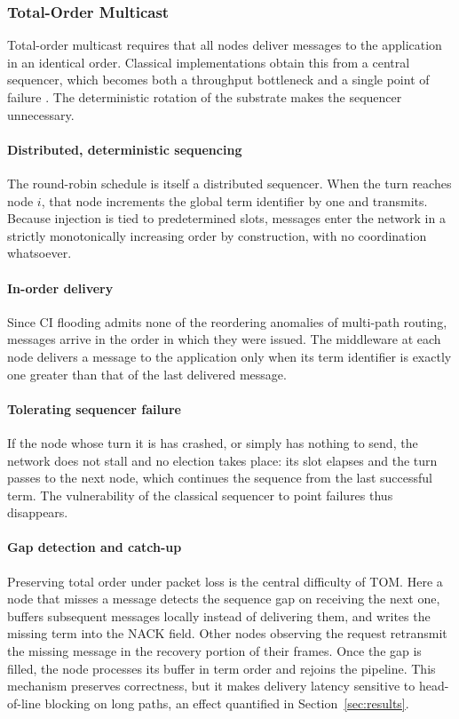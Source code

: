 \documentclass[journal]{IEEEtran}
\newcommand{\CI}{CI}                      %
\begin{document}
\subsubsection{Total-Order Multicast}
\label{sec:design-tom}

Total-order multicast requires that all nodes deliver messages to the
application in an identical order. Classical implementations obtain this
from a central sequencer, which becomes both a throughput bottleneck and a
single point of failure \cite{defago04total}. The deterministic rotation
of the substrate makes the sequencer unnecessary.

\paragraph{Distributed, deterministic sequencing}
The round-robin schedule is itself a distributed sequencer. When the turn
reaches node $i$, that node increments the global term identifier by one
and transmits. Because injection is tied to predetermined slots, messages
enter the network in a strictly monotonically increasing order by
construction, with no coordination whatsoever.

\paragraph{In-order delivery}
Since \CI{} flooding admits none of the reordering anomalies of
multi-path routing, messages arrive in the order in which they were
issued. The middleware at each node delivers a message to the application
only when its term identifier is exactly one greater than that of the last
delivered message.

\paragraph{Tolerating sequencer failure}
If the node whose turn it is has crashed, or simply has nothing to send,
the network does not stall and no election takes place: its slot elapses
and the turn passes to the next node, which continues the sequence from
the last successful term. The vulnerability of the classical sequencer to
point failures thus disappears.

\paragraph{Gap detection and catch-up}
Preserving total order under packet loss is the central difficulty of
TOM. Here a node that misses a message detects the sequence gap on
receiving the next one, buffers subsequent messages locally instead of
delivering them, and writes the missing term into the NACK field. Other
nodes observing the request retransmit the missing message in the
recovery portion of their frames. Once the gap is filled, the node
processes its buffer in term order and rejoins the pipeline. This
mechanism preserves correctness, but it makes delivery latency sensitive
to head-of-line blocking on long paths, an effect quantified in
Section~\ref{sec:results}.
\end{document}
